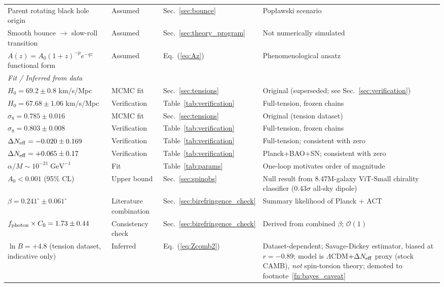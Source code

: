 \documentclass[aps,prd,twocolumn,superscriptaddress,showpacs,preprintnumbers,nofootinbib,longbibliography,floatfix]{revtex4-2}
\newcommand{\Neff}{N_{\rm eff}}
\begin{document}
\begin{table}[t]
\begin{ruledtabular}
\begin{tabular}{llll}
Parent rotating black hole origin & Assumed & Sec.~\ref{sec:bounce} & Pop\l{}awski scenario \\
Smooth bounce $\to$ slow-roll transition & Assumed & Sec.~\ref{sec:theory_program} & Not numerically simulated \\
$A(z) = A_0(1+z)^{-p}e^{-qz}$ functional form & Assumed & Eq.~(\ref{eq:Az}) & Phenomenological ansatz \\
\hline
\multicolumn{4}{l}{\textit{Fit / Inferred from data}} \\
$H_0 = 69.2 \pm 0.8$ km/s/Mpc & MCMC fit & Sec.~\ref{sec:tensions} & Original (superseded; see Sec.~\ref{sec:verification}) \\
$H_0 = 67.68 \pm 1.06$ km/s/Mpc & Verification & Table~\ref{tab:verification} & Full-tension, frozen chains \\
$\sigma_8 = 0.785 \pm 0.016$ & MCMC fit & Sec.~\ref{sec:tensions} & Original (tension dataset) \\
$\sigma_8 = 0.803 \pm 0.008$ & Verification & Table~\ref{tab:verification} & Full-tension, frozen chains \\
$\Delta\Neff = -0.020 \pm 0.169$ & Verification & Table~\ref{tab:verification} & Full-tension; consistent with zero \\
$\Delta\Neff = +0.065 \pm 0.17$ & Verification & Table~\ref{tab:verification} & Planck+BAO+SN; consistent with zero \\
$\alpha/M \sim 10^{-21}\;\text{GeV}^{-1}$ & Fit & Table~\ref{tab:params} & One-loop motivates order of magnitude \\
$A_0 < 0.001$ (95\% CL) & Upper bound & Sec.~\ref{sec:spinobs} & Null result from $8.47$M-galaxy ViT-Small chirality classifier ($0.43\sigma$ all-sky dipole) \\
$\beta = 0.241^\circ \pm 0.061^\circ$ & Literature combination & Sec.~\ref{sec:birefringence_check} & Summary likelihood of Planck + ACT \\
$f_{\rm photon} \times C_0 = 1.73 \pm 0.44$ & Consistency check & Sec.~\ref{sec:birefringence_check} & Derived from combined $\beta$; $\mathcal{O}(1)$ \\
$\ln B = +4.8$ (tension dataset, indicative only) & Inferred & Eq.~(\ref{eq:Zcomb2}) & Dataset-dependent; Savage-Dickey estimator, biased at $r=-0.89$; model is $\Lambda$CDM$+\Delta\Neff$ proxy (stock CAMB), \emph{not} spin-torsion theory; demoted to footnote~\ref{fn:bayes_caveat} \\
\end{tabular}
\end{ruledtabular}
\end{table}



\end{document}
